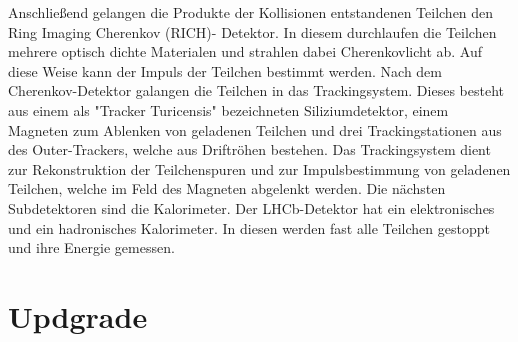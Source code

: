Anschließend gelangen die Produkte der Kollisionen entstandenen Teilchen den Ring
Imaging Cherenkov (RICH)- Detektor. In diesem  durchlaufen die Teilchen mehrere
optisch dichte Materialen und strahlen dabei Cherenkovlicht ab. Auf diese Weise
kann der Impuls der Teilchen bestimmt werden. Nach dem Cherenkov-Detektor
galangen die Teilchen in das Trackingsystem. Dieses besteht aus einem als
"Tracker Turicensis" bezeichneten Siliziumdetektor, einem Magneten zum
Ablenken von geladenen Teilchen und drei Trackingstationen aus des
Outer-Trackers, welche aus Driftröhen bestehen. Das Trackingsystem dient zur
Rekonstruktion der Teilchenspuren und zur Impulsbestimmung von geladenen
Teilchen, welche im Feld des Magneten abgelenkt werden. Die nächsten
Subdetektoren sind die Kalorimeter. Der LHCb-Detektor hat ein elektronisches
und ein hadronisches Kalorimeter. In diesen werden fast alle Teilchen gestoppt
und ihre Energie gemessen. 

\section{Updgrade}



